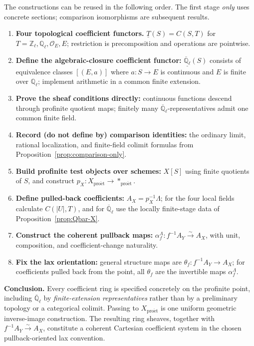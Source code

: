 \documentclass[11pt,a4paper]{article}
\numberwithin{equation}{section}
\theoremstyle{definition}
\theoremstyle{remark}
\newcommand{\proet}{\mathrm{pro\acute{e}t}}
\newcommand{\OO}{\mathcal O}
\newcommand{\ringunder}[1]{\underline{#1}}
\newcommand{\Qlbar}{\overline{\mathbb Q}_{\ell}}
\begin{document}
The constructions can be reused in the following order.  The first
stage \emph{only} uses concrete sections; comparison isomorphisms are
subsequent results.
\begin{enumerate}
 \item \textbf{Four topological coefficient functors.}
 $\ringunder T(S)=C(S,T)$ for
 $T=\mathbb Z_\ell,\mathbb Q_\ell,\OO_E,E$;
 restriction is precomposition and operations are pointwise.
 \item \textbf{Define the algebraic-closure coefficient functor:}
 $\ringunder{\Qlbar}(S)$ consists of equivalence classes $[(E,a)]$
 where $a:S\to E$ is continuous and $E$ is finite over
 $\mathbb Q_\ell$; implement arithmetic in a common finite extension.
 \item \textbf{Prove the sheaf conditions directly:}
 continuous functions descend through profinite quotient maps;
 finitely many $\Qlbar$-representatives admit one common finite field.
 \item \textbf{Record (do not define by) comparison identities:}
 the ordinary limit, rational localization, and finite-field colimit
 formulas from Proposition~\ref{prop:comparison-only}.
 \item \textbf{Build profinite test objects over schemes:}
 $X[S]$ using finite quotients of $S$, and construct
 $p_X:X_{\proet}\to*_{\proet}$.
 \item \textbf{Define pulled-back coefficients:}
 $A_X=p_X^{-1}\Lambda$; for the four local fields calculate
 $C(|U|,T)$, and for $\Qlbar$ use the locally finite-stage
 data of Proposition~\ref{prop:Qbar-X}.
 \item \textbf{Construct the coherent pullback maps:}
 $\alpha_f^\Lambda:f^{-1}A_Y\xrightarrow{\sim}A_X$,
 with unit, composition, and coefficient-change naturality.
 \item \textbf{Fix the lax orientation:}
 general structure maps are $\theta_f:f^{-1}A_Y\to A_X$;
 for coefficients pulled back from the point, all $\theta_f$
 are the invertible maps $\alpha_f^\Lambda$.
\end{enumerate}

\noindent\textbf{Conclusion.}
Every coefficient ring is specified concretely on the profinite point,
including $\Qlbar$ by \emph{finite-extension representatives} rather
than by a preliminary topology or a categorical colimit.  Passing to
$X_{\proet}$ is one uniform geometric inverse-image construction.
The resulting ring sheaves, together with
$f^{-1}A_Y\xrightarrow{\sim}A_X$, constitute a coherent Cartesian
coefficient system in the chosen pullback-oriented lax convention.
\end{document}
